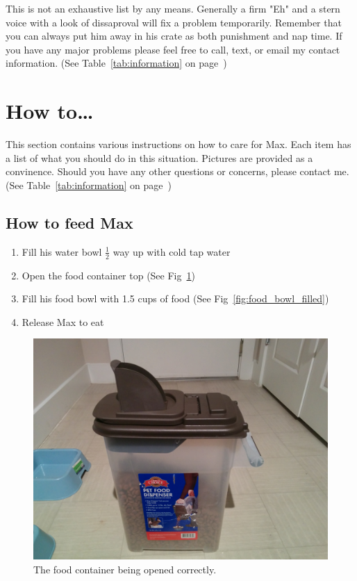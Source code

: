 \documentclass[pdftex,12pt]{article}
\begin{document}
\bigskip

This is not an exhaustive list by any means. Generally a firm "Eh" and a stern
voice with a look of dissaproval will fix a problem temporarily. Remember that
you can always put him away in his crate as both punishment and nap time. If you
have any major problems please feel free to call, text, or email my contact
information. (See Table~\ref{tab:information} on page~\pageref{tab:information})

\newpage
\section{How to\ldots}

This section contains various instructions on how to care for Max. Each item has
a list of what you should do in this situation. Pictures are provided as a
convinence. Should you have any other questions or concerns, please contact me.
(See Table~\ref{tab:information} on page~\pageref{tab:information})

\subsection{How to feed Max}
\begin{enumerate}\label{itm:how_to_feed}
    \item Fill his water bowl $\frac{1}{2}$ way up with cold tap water
    \item Open the food container top (See Fig~\ref{fig:food_container_open})
    \item Fill his food bowl with 1.5 cups of food (See Fig~\ref{fig:food_bowl_filled})
    \item Release Max to eat
\end{enumerate}

\bigskip

\begin{figure}[h!]
    \centering
    \includegraphics[width=.35\textwidth]{./images/how_to/feed_max/food_container_open.jpg}
    \caption{The food container being opened correctly.}
    \label{fig:food_container_open}
\end{figure}
\end{document}
